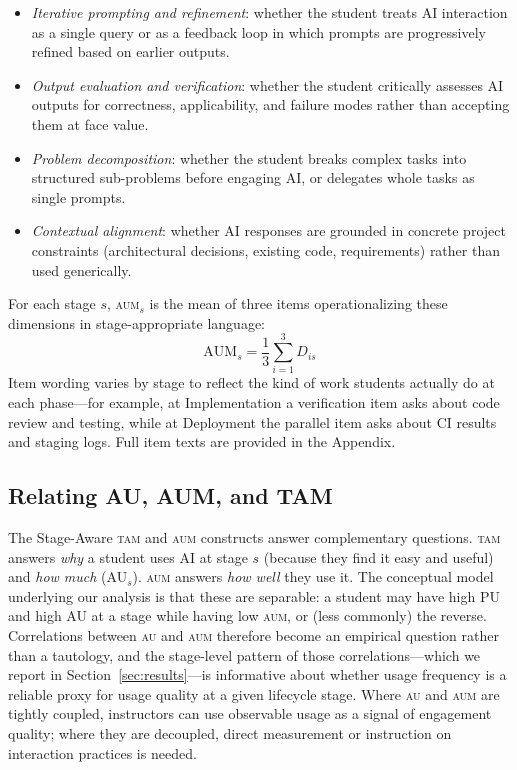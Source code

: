 \documentclass[sigconf,anonymous]{acmart}
\newcommand{\AUM}{\textsc{aum}\xspace}
\newcommand{\AU}{\textsc{au}\xspace}
\newcommand{\TAM}{\textsc{tam}\xspace}
\begin{document}
\begin{itemize}[noitemsep,topsep=2pt,leftmargin=*]
  \item \emph{Iterative prompting and refinement}: whether the student
    treats AI interaction as a single query or as a feedback loop in
    which prompts are progressively refined based on earlier outputs.
  \item \emph{Output evaluation and verification}: whether the student
    critically assesses AI outputs for correctness, applicability,
    and failure modes rather than accepting them at face value.
  \item \emph{Problem decomposition}: whether the student breaks
    complex tasks into structured sub-problems before engaging AI, or
    delegates whole tasks as single prompts.
  \item \emph{Contextual alignment}: whether AI responses are grounded
    in concrete project constraints (architectural decisions, existing
    code, requirements) rather than used generically.
\end{itemize}

For each stage $s$, \AUM$_s$ is the mean of three items
operationalizing these dimensions in stage-appropriate language:
\[
  \text{AUM}_s = \frac{1}{3} \sum_{i=1}^{3} D_{is}
\]
Item wording varies by stage to reflect the kind of work students
actually do at each phase---for example, at Implementation a
verification item asks about code review and testing, while at
Deployment the parallel item asks about CI results and staging logs.
Full item texts are provided in the Appendix.

\subsection{Relating AU, AUM, and TAM}
The Stage-Aware \TAM and \AUM constructs answer complementary
questions. \TAM answers \emph{why} a student uses AI at stage $s$
(because they find it easy and useful) and \emph{how much}
(AU$_s$). \AUM answers \emph{how well} they use it. The conceptual
model underlying our analysis is that these are separable: a student
may have high PU and high AU at a stage while having low \AUM, or
(less commonly) the reverse. Correlations between \AU and \AUM
therefore become an empirical question rather than a tautology, and
the stage-level pattern of those correlations---which we report in
Section~\ref{sec:results}---is informative about whether usage
frequency is a reliable proxy for usage quality at a given lifecycle
stage. Where \AU and \AUM are tightly coupled, instructors can use
observable usage as a signal of engagement quality; where they are
decoupled, direct measurement or instruction on interaction practices
is needed.
\end{document}
